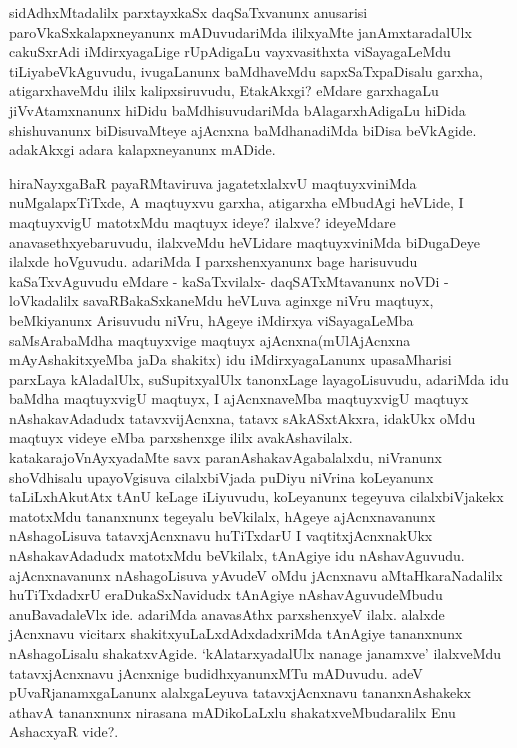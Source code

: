 \begin{artha}
sidAdhxMtadalilx parxtayxkaSx daqSaTxvanunx anusarisi paroVkaSxkalapxneyanunx mADuvudariMda ililxyaMte janAmxtaradalUlx cakuSxrAdi iMdirxyagaLige rUpAdigaLu vayxvasithxta viSayagaLeMdu tiLiyabeVkAguvudu, ivugaLanunx baMdhaveMdu sapxSaTxpaDisalu garxha, atigarxhaveMdu ililx kalipxsiruvudu, EtakAkxgi? eMdare garxhagaLu jiVvAtamxnanunx hiDidu baMdhisuvudariMda bAlagarxhAdigaLu hiDida shishuvanunx biDisuvaMteye ajAcnxna baMdhanadiMda biDisa beVkAgide. adakAkxgi adara kalapxneyanunx mADide. 
\end{artha}

\centerline{}

\begin{artha}
hiraNayxgaBaR payaRMtaviruva jagatetxlalxvU maqtuyxviniMda nuMgalapxTiTxde, A maqtuyxvu garxha, atigarxha eMbudAgi heVLide, I maqtuyxvigU matotxMdu maqtuyx ideye? ilalxve? ideyeMdare anavasethxyebaruvudu, ilalxveMdu heVLidare maqtuyxviniMda biDugaDeye ilalxde hoVguvudu. adariMda I parxshenxyanunx bage harisuvudu kaSaTxvAguvudu eMdare - kaSaTxvilalx- daqSATxMtavanunx noVDi - loVkadalilx savaRBakaSxkaneMdu heVLuva aginxge niVru maqtuyx, beMkiyanunx Arisuvudu niVru, hAgeye iMdirxya viSayagaLeMba saMsArabaMdha maqtuyxvige maqtuyx ajAcnxna(mUlAjAcnxna mAyAshakitxyeMba jaDa shakitx) idu iMdirxyagaLanunx upasaMharisi parxLaya kAladalUlx, suSupitxyalUlx tanonxLage layagoLisuvudu, adariMda idu baMdha maqtuyxvigU maqtuyx, I ajAcnxnaveMba maqtuyxvigU maqtuyx nAshakavAdadudx tatavxvijAcnxna, tatavx sAkASxtAkxra, idakUkx oMdu maqtuyx videye eMba parxshenxge ililx avakAshavilalx. katakarajoVnAyxyadaMte savx paranAshakavAgabalalxdu, niVranunx shoVdhisalu upayoVgisuva cilalxbiVjada puDiyu niVrina koLeyanunx taLiLxhAkutAtx tAnU keLage iLiyuvudu, koLeyanunx tegeyuva cilalxbiVjakekx matotxMdu tananxnunx tegeyalu beVkilalx, hAgeye ajAcnxnavanunx nAshagoLisuva tatavxjAcnxnavu huTiTxdarU I vaqtitxjAcnxnakUkx nAshakavAdadudx matotxMdu beVkilalx, tAnAgiye idu nAshavAguvudu. ajAcnxnavanunx nAshagoLisuva yAvudeV oMdu jAcnxnavu aMtaHkaraNadalilx huTiTxdadxrU eraDukaSxNavidudx tAnAgiye nAshavAguvudeMbudu anuBavadaleVlx ide. adariMda anavasAthx parxshenxyeV ilalx. alalxde jAcnxnavu vicitarx shakitxyuLaLxdAdxdadxriMda tAnAgiye tananxnunx nAshagoLisalu shakatxvAgide. `kAlatarxyadalUlx nanage janamxve' ilalxveMdu tatavxjAcnxnavu jAcnxnige budidhxyanunxMTu mADuvudu. adeV pUvaRjanamxgaLanunx alalxgaLeyuva tatavxjAcnxnavu tananxnAshakekx athavA tananxnunx nirasana mADikoLaLxlu shakatxveMbudaralilx Enu AshacxyaR vide?.
\end{artha}

